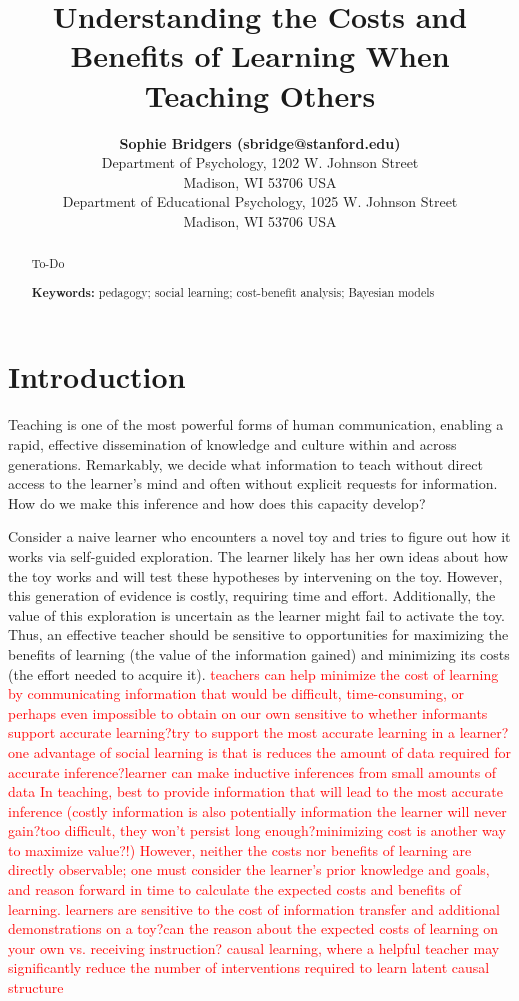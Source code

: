 \documentclass[10pt,letterpaper]{article}
\title{Understanding the Costs and Benefits of Learning When Teaching Others}
\author{{\large \bf Sophie Bridgers (sbridge@stanford.edu)} \\
  Department of Psychology, 1202 W. Johnson Street \\
  Madison, WI 53706 USA
  \AND {\large \bf Emily Tang (emjtang@stanford.edu)} \\
  Department of Educational Psychology, 1025 W. Johnson Street \\
  Madison, WI 53706 USA}
\newcommand{\red}[1]{\textcolor{Red}{#1}}
\begin{document}
\maketitle


\begin{abstract}
To-Do

\textbf{Keywords:} 
pedagogy; social learning; cost-benefit analysis; Bayesian models
\end{abstract}


\section{Introduction}

Teaching is one of the most powerful forms of human communication, enabling a rapid, effective dissemination of knowledge and culture within and across generations. Remarkably, we decide what information to teach without direct access to the learner's mind and often without explicit requests for information. How do we make this inference and how does this capacity develop? 

Consider a naive learner who encounters a novel toy and tries to figure out how it works via self-guided exploration. The learner likely has her own ideas about how the toy works and will test these hypotheses by intervening on the toy. However, this generation of evidence is costly, requiring time and effort. Additionally, the value of this exploration is uncertain as the learner might fail to activate the toy. Thus, an effective teacher should be sensitive to opportunities for maximizing the benefits of learning (the value of the information gained) and minimizing its costs (the effort needed to acquire it). 
\red{teachers can help minimize the cost of learning by communicating information that would be difficult, time-consuming, or perhaps even impossible to obtain on our own
sensitive to whether informants support accurate learning?try to support the most accurate learning in a learner?
one advantage of social learning is that is reduces the amount of data required for accurate inference?learner can make inductive inferences from small amounts of data
In teaching, best to provide information that will lead to the most accurate inference (costly information is also potentially information the learner will never gain?too difficult, they won't persist long enough?minimizing cost is another way to maximize value?!)
However, neither the costs nor benefits of learning are directly observable; one must consider the learner's prior knowledge and goals, and reason forward in time to calculate the expected costs and benefits of learning.
learners are sensitive to the cost of information transfer and additional demonstrations on a toy?can the reason about the expected costs of learning on your own vs. receiving instruction?
causal learning, where a helpful teacher may significantly reduce the number of interventions required to learn latent causal structure}
\end{document}
